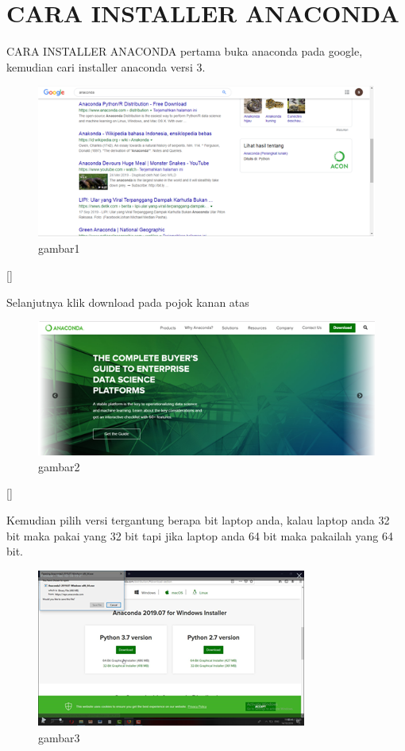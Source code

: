 \section{CARA INSTALLER ANACONDA}
\par

CARA INSTALLER ANACONDA
pertama buka anaconda pada google, kemudian cari installer anaconda versi 3.
\begin{figure}[h]
\centering
\includegraphics[scale=0.9]{gambar/1.png}
\caption{gambar1}
\label{fig:my_label}
\end{figure}[]

Selanjutnya klik download pada pojok kanan atas
\begin{figure}[h]
\centering
\includegraphics[scale=0.7]{gambar/2.png}
\caption{gambar2}
\label{fig:my_label}
\end{figure}[]

Kemudian pilih versi tergantung berapa bit laptop anda, kalau laptop anda 32 bit maka pakai yang 32 bit tapi jika laptop anda 64 bit maka pakailah yang 64 bit.
\begin{figure}[h]
\centering
\includegraphics[scale=1.3]{gambar/3.png}
\caption{gambar3}
\label{fig:my_label}
\end{figure}

